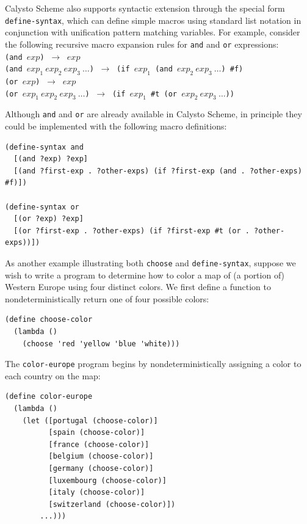 \documentclass[acmsmall,screen,authorversion]{acmart}
\begin{document}
\noindent
Calysto Scheme also supports syntactic extension through the special form
\texttt{define-syntax}, which can define simple macros using standard list
notation in conjunction with unification pattern matching variables.  For
example, consider the following recursive macro expansion rules for
\texttt{and} and \texttt{or} expressions:\\

{\footnotesize
\noindent
\texttt{(and $\mathit{exp}$)} $~\rightarrow~$ $\mathit{exp}$\\
\texttt{(and $\mathit{exp}_1~\mathit{exp}_2~\mathit{exp}_3~\ldots$)} $~\rightarrow~$
\texttt{(if $\mathit{exp}_1$ (and $\mathit{exp}_2~\mathit{exp}_3~\ldots$) \#f)}\\

\noindent
\texttt{(or $\mathit{exp}$)} $~\rightarrow~$ $\mathit{exp}$\\
\texttt{(or $\mathit{exp}_1~\mathit{exp}_2~\mathit{exp}_3~\ldots$)} $~\rightarrow~$
\texttt{(if $\mathit{exp}_1$ \#t (or $\mathit{exp}_2~\mathit{exp}_3~\ldots$))}\\
}

\noindent
Although \texttt{and} and \texttt{or} are already available in Calysto Scheme,
in principle they could be implemented with the following macro definitions:

{\footnotesize
\begin{verbatim}
(define-syntax and
  [(and ?exp) ?exp]
  [(and ?first-exp . ?other-exps) (if ?first-exp (and . ?other-exps) #f)])

(define-syntax or
  [(or ?exp) ?exp]
  [(or ?first-exp . ?other-exps) (if ?first-exp #t (or . ?other-exps))])
\end{verbatim}
}

\noindent
As another example illustrating both \texttt{choose} and
\texttt{define-syntax}, suppose we wish to write a program to determine how to
color a map of (a portion of) Western Europe using four distinct colors.  We
first define a function to nondeterministically return one of four possible
colors:

{\footnotesize
\begin{verbatim}
(define choose-color
  (lambda ()
    (choose 'red 'yellow 'blue 'white)))
\end{verbatim}
}

\noindent
The \texttt{color-europe} program begins by nondeterministically assigning a
color to each country on the map:

\begin{minipage}{\textwidth}
{\footnotesize
\begin{verbatim}
(define color-europe
  (lambda ()
    (let ([portugal (choose-color)]
          [spain (choose-color)]
          [france (choose-color)]
          [belgium (choose-color)]
          [germany (choose-color)]
          [luxembourg (choose-color)]
          [italy (choose-color)]
          [switzerland (choose-color)])
        ...)))
\end{verbatim}
}
\end{minipage}
\end{document}
